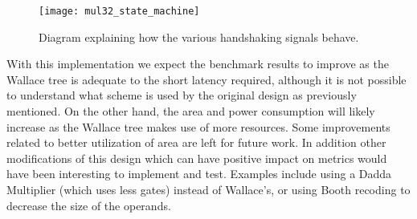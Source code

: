\begin{figure}[H]
\centering
\texttt{[image: mul32\_state\_machine]}
\caption{Diagram explaining how the various handshaking signals behave.}
\label{fig:mul32_state_machine}
\end{figure}



With this implementation we expect the benchmark results to improve as the Wallace tree is adequate to the short latency required, although it is not possible to understand what scheme is used by the original design as previously mentioned. On the other hand, the area and power consumption will likely increase as the Wallace tree makes use of more resources. Some improvements related to better utilization of area are left for future work. In addition other modifications of this design which can have positive impact on metrics would have been interesting to implement and test. Examples include using a Dadda Multiplier (which uses less gates) instead of Wallace's, or using Booth recoding to decrease the size of the operands.


